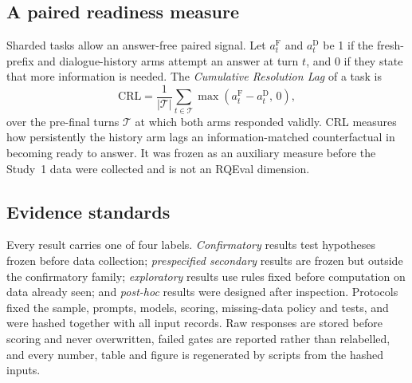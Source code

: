 \subsection{A paired readiness measure}

Sharded tasks allow an answer-free paired signal. Let $a_t^{\mathrm{F}}$ and
$a_t^{\mathrm{D}}$ be 1 if the fresh-prefix and dialogue-history arms attempt an
answer at turn $t$, and 0 if they state that more information is needed. The
\emph{Cumulative Resolution Lag} of a task is
\begin{equation}
  \mathrm{CRL} = \frac{1}{|\mathcal{T}|}\sum_{t\in\mathcal{T}}
  \max\!\left(a_t^{\mathrm{F}}-a_t^{\mathrm{D}},\,0\right),
\end{equation}
over the pre-final turns $\mathcal{T}$ at which both arms responded validly.
CRL measures how persistently the history arm lags an information-matched
counterfactual in becoming ready to answer. It was frozen as an auxiliary
measure before the Study~1 data were collected and is not an RQEval dimension.

\subsection{Evidence standards}

Every result carries one of four labels. \emph{Confirmatory} results test
hypotheses frozen before data collection; \emph{prespecified secondary}
results are frozen but outside the confirmatory family; \emph{exploratory}
results use rules fixed before computation on data already seen; and
\emph{post-hoc} results were designed after inspection. Protocols fixed the
sample, prompts, models, scoring, missing-data policy and tests, and were
hashed together with all input records. Raw responses are stored before scoring
and never overwritten, failed gates are reported rather than relabelled, and
every number, table and figure is regenerated by scripts from the hashed
inputs.
